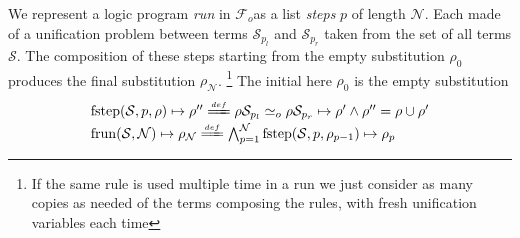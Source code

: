 \documentclass[sigconf,natbib=false,review]{acmart}
\newcommand{\UnifRel}{\ensuremath{\simeq}}
\newcommand{\Uo}{\ensuremath{\UnifRel_o}\xspace}
\newcommand{\Ue}{\ensuremath{\UnifRel_\lambda}\xspace}
\newcommand{\Fo}{\ensuremath{\mathcal{F}_{\!o}\xspace}} %
\begin{document}
We represent a logic program \emph{run} in \Fo as
a list \emph{steps} $p$ of length $\mathcal{N}$. Each made of a
unification problem between terms $\mathcal{S}_{p_l}$ and
$\mathcal{S}_{p_r}$ taken from the set of all terms $\mathcal{S}$.
The composition of these steps starting from the
empty substitution $\rho_0$ produces the final
substitution $\rho_\mathcal{N}$.
\footnote{If the same rule is used multiple time in a run we
just consider as many copies as needed of the terms composing the
rules, with fresh unification variables each time}
The initial here $\rho_0$ is the empty substitution
%
\newcommand{\progress}{\ensuremath{\mathrm{progress}}\xspace}
\newcommand{\fstep}{\ensuremath{\mathrm{fstep}}\xspace}
\newcommand{\hstep}{\ensuremath{\mathrm{hstep}}\xspace}
\newcommand{\frun}{\ensuremath{\mathrm{frun}}\xspace}
\newcommand{\hrun}{\ensuremath{\mathrm{hrun}}\xspace}
\newcommand{\stepF}[4]{\ensuremath{\fstep(#1,#2,#3) \mapsto #4}}
\newcommand{\stepFD}[5]{%
\ensuremath{#3 #1_{#2_l} \Uo #3 #1_{#2_r} \mapsto #4 \land #5 = #3 \cup #4}}
\newcommand{\stepH}[6]{\ensuremath{\hstep(#1,#2,#3,#4) \mapsto (#5, #6)}}
\newcommand{\stepHD}[6]{\ensuremath{%
#3 #1_{#2_l} \Ue #3 #1_{#2_r} \mapsto #4 \land \progress(#6,#3 \cup #4) \mapsto (#6',#5)}}
\newcommand{\runF}[3]{\ensuremath{\frun(#1,#2) \mapsto #3_{#2}}}
\newcommand{\runFD}[2]{\ensuremath{%
\bigwedge_{p = 1}^{#2} \stepF{#1}{p}{\rho_{p-1}}{\rho_{p}}}}
\newcommand{\runH}[3]{\ensuremath{\hrun(#1,#2) \mapsto #3_{#2}}}
\newcommand{\runHD}[3]{\ensuremath{%
\bigwedge_{p = 1}^{#2} \stepH{#1}{p}{\sigma_{p-1}}{#3_{p-1}}{\sigma_{p}}{#3_p}}}
\newcommand{\deff}{\ensuremath{\stackrel{{\scriptscriptstyle def}}{=\!=\!\!\!=}}}
\newcommand{\linkStore}{\ensuremath{\mathbb{L}}\xspace}
\newcommand{\mapStore}{\ensuremath{\mathbb{M}}\xspace}
%
$$
\begin{array}{l}
\stepF{\mathcal{S}}{p}{\rho}{\rho''}
\deff
\stepFD{\mathcal{S}}{p}{\rho}{\rho'}{\rho''}\vspace{2pt}\\
\runF{\mathcal{S}}{\mathcal{N}}{\rho}
\deff
\runFD{\mathcal{S}}{\mathcal{N}}
\end{array}
$$
\end{document}
